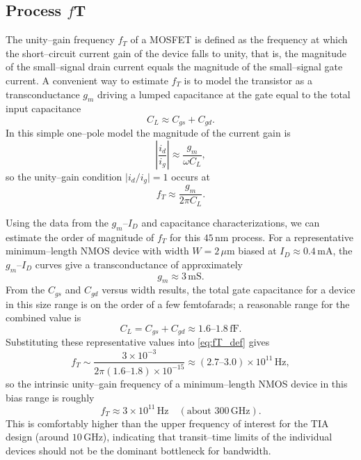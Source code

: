 \documentclass[11pt]{article}
\begin{document}
\newpage

\subsection{Process $f$T}

The unity–gain frequency $f_T$ of a MOSFET is defined as the frequency at which
the short–circuit current gain of the device falls to unity, that is, the
magnitude of the small–signal drain current equals the magnitude of the
small–signal gate current. A convenient way to estimate $f_T$ is to model the
transistor as a transconductance $g_m$ driving a lumped capacitance at the gate
equal to the total input capacitance
\[
  C_L \approx C_{gs} + C_{gd}.
\]
In this simple one–pole model the magnitude of the current gain is
\[
  \left|\frac{i_d}{i_g}\right| \approx \frac{g_m}{\omega C_L},
\]
so the unity–gain condition $\lvert i_d / i_g \rvert = 1$ occurs at
\begin{equation}
  f_T \approx \frac{g_m}{2\pi C_L}.
  \label{eq:fT_def}
\end{equation}

Using the data from the $g_m$–$I_D$ and capacitance characterizations, we can
estimate the order of magnitude of $f_T$ for this $45\,\mathrm{nm}$ process. For
a representative minimum–length NMOS device with width
$W = 2\,\mu\mathrm{m}$ biased at $I_D \approx 0.4\,\mathrm{mA}$, the
$g_m$–$I_D$ curves give a transconductance of approximately
\[
  g_m \approx 3\,\mathrm{mS}.
\]
From the $C_{gs}$ and $C_{gd}$ versus width results, the total gate
capacitance for a device in this size range is on the order of a few
femtofarads; a reasonable range for the combined value is
\[
  C_L = C_{gs} + C_{gd} \approx 1.6\text{–}1.8\,\mathrm{fF}.
\]
Substituting these representative values into \eqref{eq:fT_def} gives
\[
  f_T \sim
  \frac{3\times10^{-3}}
       {2\pi (1.6\text{–}1.8)\times10^{-15}}
  \approx (2.7\text{–}3.0)\times10^{11}\,\mathrm{Hz},
\]
so the intrinsic unity–gain frequency of a minimum–length NMOS device in this
bias range is roughly
\[
  f_T \approx 3\times10^{11}\,\mathrm{Hz}
  \quad (\text{about } 300\,\mathrm{GHz}).
\]
This is comfortably higher than the upper frequency of interest for the TIA
design (around $10\,\mathrm{GHz}$), indicating that transit–time limits of the
individual devices should not be the dominant bottleneck for bandwidth.
\end{document}
